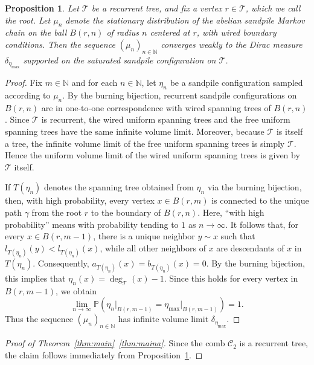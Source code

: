 \documentclass[11pt]{article}
\newtheorem{proposition}{Proposition}[section]
\newcommand{\Prob}{\mathbb{P}}
\begin{document}
\begin{proposition}\label{prop:rec-tree}
    Let $\mathcal{T}$ be a recurrent tree, and fix a vertex $r\in\mathcal{T}$, which we call the root. Let $\mu_n$ denote the stationary distribution of the abelian sandpile Markov chain on the ball $B(r,n)$ of radius $n$ centered at $r$, with wired boundary conditions. Then the sequence $(\mu_n)_{n\in\mathbb{N}}$ converges weakly to the Dirac measure $\delta_{\eta_{\mathrm{max}}}$ supported on the saturated sandpile configuration on $\mathcal{T}$.
\end{proposition}
\begin{proof}
    Fix $m\in\mathbb{N}$ and for each $n\in\mathbb{N}$, let $\eta_n$ be a sandpile configuration sampled according to $\mu_n$. By the burning bijection, recurrent sandpile configurations on $B(r,n)$ are in one-to-one correspondence with wired spanning trees of $B(r,n)$. Since $\mathcal{T}$ is recurrent, the wired uniform spanning trees and the free uniform spanning trees have the same infinite volume limit. Moreover, because $\mathcal{T}$ is itself a tree, the infinite volume limit of the free uniform spanning trees is simply $\mathcal{T}$. Hence the uniform volume limit of the wired uniform spanning trees is given by $\mathcal{T}$ itself.

    If $T(\eta_n)$ denotes the spanning tree obtained from $\eta_n$ via the burning bijection, then, with high probability, every vertex $x\in B(r,m)$ is connected to the unique path $\gamma$ from the root $r$ to the boundary of $B(r,n)$. Here, “with high probability” means with probability tending to $1$ as $n\to\infty$. It follows that, for every $x\in B(r,m-1)$, there is a unique neighbor $y\sim x$ such that $l_{T(\eta_n)}(y)<l_{T(\eta_n)}(x)$, while all other neighbors of $x$ are descendants of $x$ in $T(\eta_n)$. Consequently, $a_{T(\eta_n)}(x)=b_{T(\eta_n)}(x)=0$. By the burning bijection, this implies that $\eta_n(x)=\deg_{\mathcal{T}}(x)-1$. Since this holds for every vertex in $B(r,m-1)$, we obtain
 \[
 \lim_{n\to\infty}\Prob(\eta_n\vert_{B(r,m-1)}=\eta_{\text{max}}\vert_{B(r,m-1)})=1.
 \]
Thus the sequence $(\mu_n)_{n\in\mathbb{N}}$ has infinite volume limit $\delta_{\eta_{\mathrm{max}}}$.
\end{proof}

\begin{proof}[Proof of Theorem~\ref{thm:main}~\ref{thm:maina}]
   Since the comb $\mathcal{C}_2$ is a recurrent tree, the claim follows immediately from Proposition~\ref{prop:rec-tree}.
\end{proof}
\end{document}

